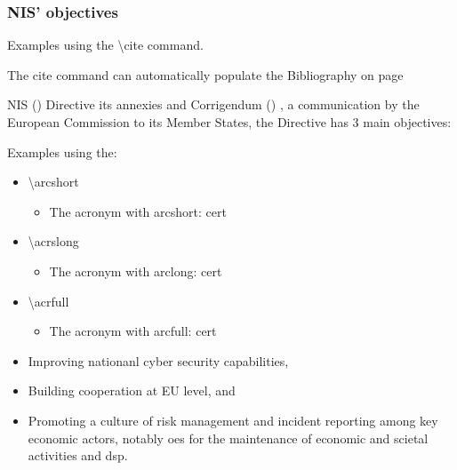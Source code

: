 {\subsubsection{NIS' objectives}

\begin{notes}[Citations]
    Examples using the \textbackslash cite command.

    The cite command can automatically populate the Bibliography on page \pageref{sec:bibliography}
\end{notes}

NIS (\cite{VIIRA2018}) Directive its annexies and Corrigendum (\cite{EuropeanCommission2017}) , a communication by the European Commission to its Member States, the Directive has 3 main objectives:

\begin{notes}
    Examples using the:
    \begin{itemize}
        \item \textbackslash arcshort
            \begin{itemize}
                \item The acronym with arcshort: \acrshort{cert}
            \end{itemize}
        \item \textbackslash acrslong
            \begin{itemize}
                \item The acronym with arclong: \acrlong{cert}
            \end{itemize}
        \item \textbackslash acrfull
            \begin{itemize}
                \item The acronym with arcfull: \acrfull{cert}
            \end{itemize}
    \end{itemize}
\end{notes}

\begin{itemize}
    \item Improving nationanl cyber security capabilities,
    \item Building cooperation at EU level, and
    \item Promoting a culture of risk management and incident reporting among key economic actors, notably \acrfull{oes} for the maintenance of economic and scietal activities and \acrfull{dsp}.
\end{itemize}

}

